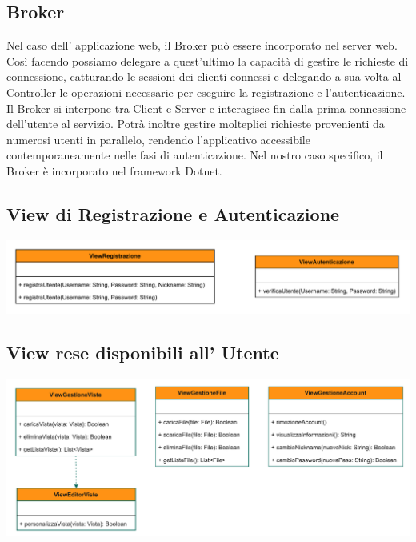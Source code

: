 \subsection*{Broker}
{}
Nel caso dell' applicazione web, il Broker può essere incorporato nel server web.
\\Così facendo possiamo delegare a quest'ultimo la capacità di gestire le richieste di connessione, catturando le sessioni dei clienti connessi e delegando a sua volta al Controller le operazioni necessarie per eseguire la registrazione e l'autenticazione.\\
Il Broker si interpone tra Client e Server e interagisce fin dalla prima connessione dell'utente al servizio. Potrà inoltre gestire molteplici richieste provenienti da numerosi utenti in parallelo, rendendo l'applicativo accessibile contemporaneamente nelle fasi di autenticazione.
Nel nostro caso specifico, il Broker è incorporato nel framework Dotnet. 
\vspace{0.5cm}


\pagebreak
\subsection*{View di Registrazione e Autenticazione}
{}
\begin{adjustwidth}{-2cm}{0cm}
\includegraphics[scale=0.8]{progettazione/Progettazione-Interfacce Disponibili Registrazione_Autenticazione.drawio.pdf}
\end{adjustwidth}
\vspace{0.5cm}
\vspace{0.5cm}




\subsection*{View rese disponibili all' Utente}
{}
\begin{adjustwidth}{-2cm}{0cm}
\includegraphics[scale=0.9]{progettazione/Progettazione-Interfacce Disponibili all' Utente.drawio.pdf}
\end{adjustwidth}
\vspace{0.5cm}
\vspace{0.5cm}



